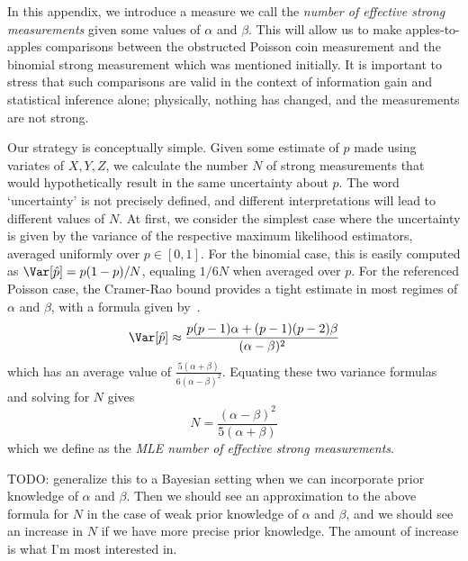 \documentclass[aps,prl,twocolumn,superscriptaddress]{revtex4}
\begin{document}
In this appendix, we introduce a measure we call the \textit{number of effective strong measurements} 
given some values of $\alpha$ and $\beta$.
This will allow us to make apples-to-apples comparisons between the obstructed
Poisson coin measurement and the binomial strong measurement which was mentioned initially.
It is important to stress that such comparisons are valid in the context of 
information gain and statistical inference alone; physically, nothing 
has changed, and the measurements are not strong.

Our strategy is conceptually simple. Given some estimate of $p$ 
made using variates of $X,Y,Z$, we calculate the number $N$ of strong measurements 
that would hypothetically result in the same uncertainty about $p$.
The word `uncertainty' is not precisely defined, and different interpretations 
will lead to different values of $N$.
At first, we consider the simplest case where the uncertainty is given by the variance 
of the respective maximum likelihood estimators, averaged uniformly over $p\in[0,1]$.
For the binomial case, this is easily computed as $\Var[\hat{p}]=p(1-p)/N$, equaling $1/6N$ when 
averaged over $p$.
For the referenced Poisson case, the Cramer-Rao bound provides a tight estimate 
in most regimes of $\alpha$ and $\beta$, with a formula given by~\citep{hincks_statistical_2017}.
\begin{equation}
    \Var[\hat{p}]\approx\frac{p(p-1)\alpha+(p-1)(p-2)\beta}{(\alpha-\beta)^2}
\end{equation}
which has an average value of $\frac{5(\alpha+\beta)}{6(\alpha-\beta)^2}$.
Equating these two variance formulas and solving for $N$ gives 
\begin{equation}
    N=\frac{(\alpha-\beta)^2}{5(\alpha+\beta)}
\end{equation}
which we define as the \textit{MLE number of effective strong measurements}.

TODO: generalize this to a Bayesian setting when we can incorporate prior
knowledge of $\alpha$ and $\beta$.
Then we should see an approximation to the above formula for $N$ in the case
of weak prior knowledge of $\alpha$ and $\beta$, and we should see an increase 
in $N$ if we have more precise prior knowledge.
The amount of increase is what I'm most interested in.
\end{document}
